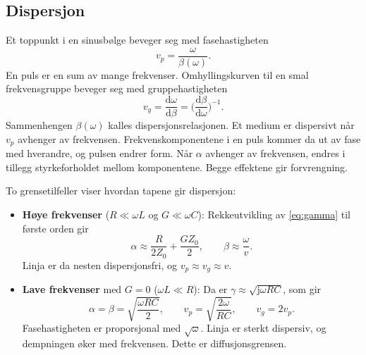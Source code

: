 \documentclass[11pt,a4paper]{article}
\numberwithin{equation}{section}
\numberwithin{figure}{section}
\numberwithin{table}{section}
\newcommand{\dd}{\mathrm{d}}
\newcommand{\jj}{\mathrm{j}}
\begin{document}
\subsection{Dispersjon}\label{sec:dispersjon}
Et toppunkt i en sinusbølge beveger seg med fasehastigheten
\begin{equation}
  v_p = \frac{\omega}{\beta(\omega)}. \label{eq:vp}
\end{equation}
En puls er en sum av mange frekvenser. Omhyllingskurven til en smal
frekvensgruppe beveger seg med gruppehastigheten \cite{pozar2012}
\begin{equation}
  v_g = \frac{\dd\omega}{\dd\beta} = \Big(\frac{\dd\beta}{\dd\omega}\Big)^{-1}. \label{eq:vg}
\end{equation}
Sammenhengen $\beta(\omega)$ kalles dispersjonsrelasjonen. Et medium er
dispersivt når $v_p$ avhenger av frekvensen. Frekvenskomponentene i en puls
kommer da ut av fase med hverandre, og pulsen endrer form. Når $\alpha$ avhenger
av frekvensen, endres i tillegg styrkeforholdet mellom komponentene. Begge
effektene gir forvrengning.

To grensetilfeller viser hvordan tapene gir dispersjon:
\begin{itemize}
  \item \textbf{Høye frekvenser} ($R \ll \omega L$ og $G \ll \omega C$):
        Rekkeutvikling av \eqref{eq:gamma} til første orden gir
        \begin{equation}
          \alpha \approx \frac{R}{2Z_0} + \frac{GZ_0}{2}, \qquad
          \beta \approx \frac{\omega}{v}. \label{eq:lavtap}
        \end{equation}
        Linja er da nesten dispersjonsfri, og $v_p \approx v_g \approx v$.
  \item \textbf{Lave frekvenser} med $G = 0$ ($\omega L \ll R$): Da er
        $\gamma \approx \sqrt{\jj\omega RC}$, som gir
        \begin{equation}
          \alpha = \beta = \sqrt{\frac{\omega RC}{2}}, \qquad
          v_p = \sqrt{\frac{2\omega}{RC}}, \qquad v_g = 2v_p. \label{eq:diffregime}
        \end{equation}
        Fasehastigheten er proporsjonal med $\sqrt{\omega}$. Linja er sterkt
        dispersiv, og dempningen øker med frekvensen. Dette er
        diffusjonsgrensen.
\end{itemize}
\end{document}
